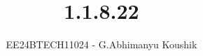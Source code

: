 \documentclass[journal]{IEEEtran}
\begin{document}

\vspace{3cm}

\title{1.1.8.22}
\author{EE24BTECH11024 - G.Abhimanyu Koushik}
{\let\newpage\relax\maketitle}

\renewcommand{\thefigure}{\theenumi}
\renewcommand{\thetable}{\theenumi}
\setlength{\intextsep}{10pt} %


\renewcommand{\thetable}{\theenumi}
\end{document}
